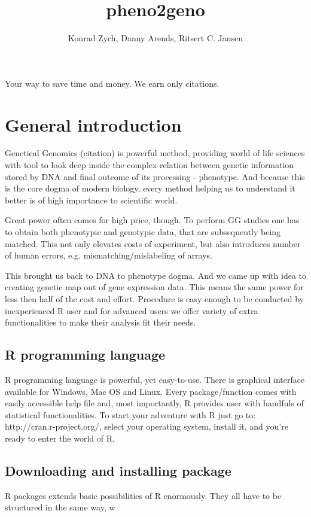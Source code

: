 \documentclass{article}
\title {pheno2geno}
\begin{document}
\maketitle
Your way to save time and money. We earn only citations.

\author{Konrad Zych, Danny Arends, Ritsert C. Jansen}
\newpage
\section{General introduction}
\begin{multicols}{2}
{\noindent}Genetical Genomics (citation) is powerful method, providing world of life sciences with tool to look deep inside the complex relation between genetic information stored by DNA and final outcome of its processing - phenotype. And because this is the core dogma of modern biology, every method helping us to understand it better is of high importance to scientific world. 

{\noindent}Great power often comes for high price, though. To perform GG studies one has to obtain both phenotypic and genotypic data, that are subsequently being matched. This not only elevates costs of experiment, but also introduces number of human errors, e.g. mismatching/mislabeling of arrays.

{\noindent}This brought us back to DNA to phenotype dogma. And we came up with idea to creating genetic map out of gene expression data. This means the same power for less then half of the cost and effort. Procedure is easy enough to be conducted by inexperienced R user and for advanced users we offer variety of extra functionalities to make their analysis fit their needs.
\subsection{R programming language}
R programming language is powerful, yet easy-to-use. There is graphical interface available for Windows, Mac OS and Linux. Every package/function comes with easily accessible help file and, most importantly, R provides user with handfuls of statistical functionalities. To start your adventure with R just go to: http://cran.r-project.org/, select your operating system, install it, and you're ready to enter the world of R.
\subsection{Downloading and installing package}
R packages extends basic possibilities of R enormously. They all have to be structured in the same way, w
\end{multicols}
\newpage
\end{document}
